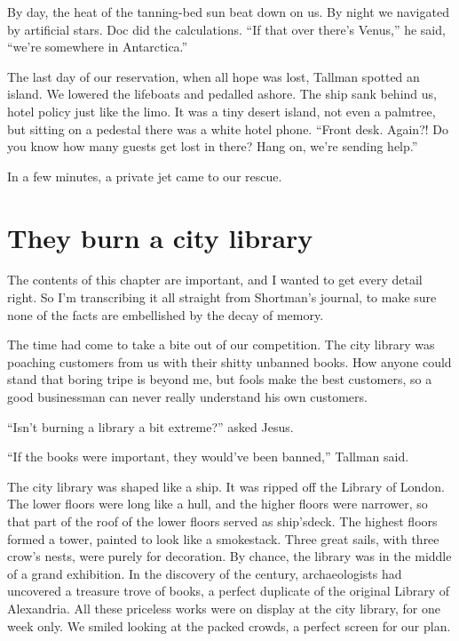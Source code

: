 \documentclass[oneside]{book}
\begin{document}
By day, the heat of the tanning-bed sun beat down on us.
By night we navigated by artificial stars.  Doc did the calculations.  ``If that over there's Venus,''
he said, ``we're somewhere in Antarctica.''

The last day of our reservation,
when all hope was lost, Tallman spotted an island.  We lowered the lifeboats and pedalled ashore.  The ship sank behind us,
hotel policy just like the limo.
It was a tiny desert island, not even a palmtree, but sitting on a pedestal there was a white hotel phone.
``Front desk.  Again?!  Do you know how many guests get lost in there?  Hang on,
we're sending help.''

In a few minutes, a private jet came to our rescue.

\chapter{They burn a city library}

The contents of this chapter are important, and I wanted to get every detail right.
So I'm transcribing it all straight from Shortman's journal, to make sure none of the facts
are embellished by the decay of memory.

The time had come to take a bite out of our competition.  The city library was poaching customers from us
with their shitty unbanned books.  How anyone could stand that boring tripe is beyond me, but fools make the
best customers, so a good businessman can never really understand his own customers.

``Isn't burning a library a bit extreme?'' asked Jesus.

``If the books were important, they would've been banned,'' Tallman said.

The city library was shaped like a ship.  It was ripped off the Library of London.
The lower floors were long like a hull, and the higher floors were narrower, so that part of the roof
of the lower floors served as ship'sdeck.  The highest floors formed a tower, painted to look like a
smokestack.  Three great sails, with three crow's nests, were purely for decoration.  By chance, the library
was in the middle of a grand exhibition.  In the discovery of the century, archaeologists had uncovered
a treasure trove of books, a perfect duplicate of the original Library of Alexandria.  All these priceless
works were on display at the city library, for one week only.  We smiled looking at the packed crowds,
a perfect screen for our plan.
\end{document}
